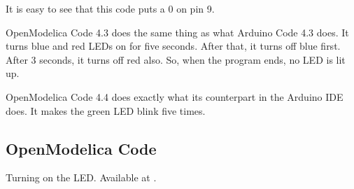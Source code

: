 It is easy to see that this code puts a 0 on pin 9.

OpenModelica Code 4.3 does the same thing as what Arduino Code 4.3 does. It turns
blue and red LEDs on for five seconds. After that, it turns off blue first. After
3 seconds, it turns off red also. So, when the program ends, no LED is lit up.

OpenModelica Code 4.4 does exactly what its counterpart in the Arduino IDE does.
It makes the green LED blink five times. 

\subsection{OpenModelica Code}
\lstset{style=mystyle}
\label{sec:led-OpenModelica-code}

\begin{OpenModelicacode}
  {Turning on the LED.  Available at
    .}
  \label{OpenModelica:led-blue}
  
\end{OpenModelicacode}

\begin{OpenModelicacode}
  \label{OpenModelica:led-blue-delay}
  
\end{OpenModelicacode}

\begin{OpenModelicacode}
  \label{OpenModelica:led-blue-red}
  
\end{OpenModelicacode}

\begin{OpenModelicacode}
  \label{OpenModelica:led-green-blink}
  
\end{OpenModelicacode}

